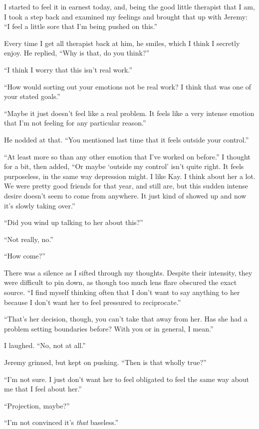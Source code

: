 I started to feel it in earnest today, and, being the good little therapist that I am, I took a step back and examined my feelings and brought that up with Jeremy: ``I feel a little sore that I'm being pushed on this.''

Every time I get all therapist back at him, he smiles, which I think I secretly enjoy. He replied, ``Why is that, do you think?''

``I think I worry that this isn't real work.''

``How would sorting out your emotions not be real work? I think that was one of your stated goals.''

``Maybe it just doesn't feel like a real problem. It feels like a very intense emotion that I'm not feeling for any particular reason.''

He nodded at that. ``You mentioned last time that it feels outside your control.''

``At least more so than any other emotion that I've worked on before.'' I thought for a bit, then added, ``Or maybe `outside my control' isn't quite right. It feels purposeless, in the same way depression might. I like Kay. I think about her a lot. We were pretty good friends for that year, and still are, but this sudden intense desire doesn't seem to come from anywhere. It just kind of showed up and now it's slowly taking over.''

``Did you wind up talking to her about this?''

``Not really, no.''

``How come?''

There was a silence as I sifted through my thoughts. Despite their intensity, they were difficult to pin down, as though too much lens flare obscured the exact source. ``I find myself thinking often that I don't want to say anything to her because I don't want her to feel pressured to reciprocate.''

``That's her decision, though, you can't take that away from her. Has she had a problem setting boundaries before? With you or in general, I mean.''

I laughed. ``No, not at all.''

Jeremy grinned, but kept on pushing. ``Then is that wholly true?''

``I'm not sure. I just don't want her to feel obligated to feel the same way about me that I feel about her.''

``Projection, maybe?''

``I'm not convinced it's \emph{that} baseless.''

